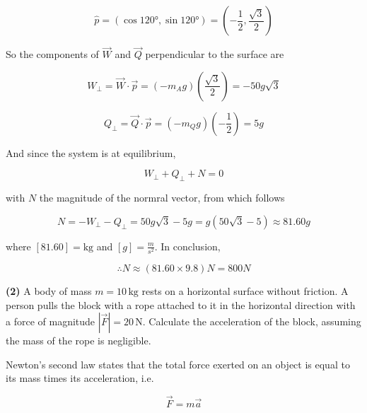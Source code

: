 \documentclass[12pt]{article}
\theoremstyle{definition}
\begin{document}
\begin{equation}
    \hat{p} = (\cos \ang{120}, \sin \ang{120}) = \left( -\frac{1}{2}, 
    \frac{ \sqrt{3} }{2}  \right) 
\end{equation}

So the components of $\vec{W}$ and $\vec{Q}$ perpendicular to the surface are 

\begin{equation}
    W_{\perp} = \vec{W} \cdot \vec{p} = \left( -m_Ag \right) 
    \left( \frac{ \sqrt{3} }{2}  \right) = -50g\sqrt{3} 
\end{equation}

\begin{equation}
    Q_{\perp} = \vec{Q} \cdot \vec{p} = \left( -m_Q g \right) \left(
    -\frac{1}{2} \right) = 5g
\end{equation}

And since the system is at equilibrium, 

\begin{equation}
    W_{\perp} + Q_\perp + N = 0
\end{equation}

with $N$ the magnitude of the normral vector, from which follows 

\begin{equation}
    N = -W_{\perp} - Q_\perp = 50g\sqrt{3}  - 5g = g(50\sqrt{3} - 5 ) \approx
    81.60g 
\end{equation}

where $\left[ 81.60 \right] = \text{kg}$ and $\left[ g \right] = \frac{m}{s^2}$.
In conclusion, 

\begin{equation}
    \therefore N \approx ( 81.60 \times 9.8 )N = 800N
\end{equation}

\pagebreak 

\begin{shaded}
\textbf{(2)} A body of mass $m = 10 \,\text{kg}$ rests on a horizontal surface without friction. A person pulls the block with a rope attached to it in the horizontal direction with a force of magnitude $|\vec{F}| = 20 \,\text{N}$. Calculate the acceleration of the block, assuming the mass of the rope is negligible.
\end{shaded}

Newton's second law states that the total force exerted on an object is equal to
its mass times its acceleration, i.e. 

\begin{equation*}
    \vec{F} = m \vec{a}
\end{equation*}
\end{document}
